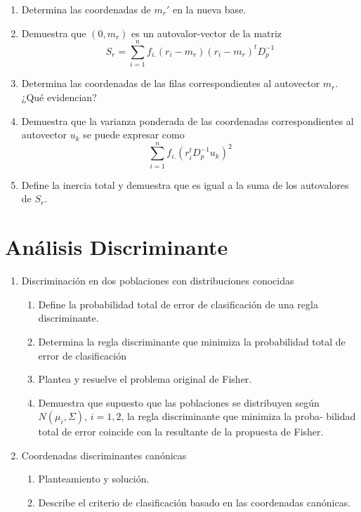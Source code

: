 \documentclass[twoside]{article}
\begin{document}
\begin{enumerate}
\item Determina las coordenadas de $m_r'$ en la nueva base. 
\item Demuestra que $(0, m_r)$ es un autovalor-vector de la matriz
\[ S_r = \sum_{i=1}^n f_{i.} (r_i - m_r) (r_i - m_r)^t D_p^{-1} \]
\item Determina las coordenadas de las filas correspondientes al autovector $m_r$. ¿Qué evidencian?
\item Demuestra que la varianza ponderada de las coordenadas correspondientes al autovector $u_k$ se puede expresar como
\[ \sum_{i=1}^n f_{i.} (r_i^t D_p^{-1} u_k)^2 \]
\item Define la inercia total y demuestra que es igual a la suma de los autovalores de $S_r$.
\end{enumerate}

\section{Análisis Discriminante}
\begin{enumerate}
\item Discriminación en dos poblaciones con distribuciones conocidas
\begin{enumerate}
	\item Define la probabilidad total de error de clasificación de una regla discriminante.
	\item Determina la regla discriminante que minimiza la probabilidad total de error de clasificación 
	\item Plantea y resuelve el problema original de Fisher. 
	\item Demuestra que supuesto que las poblaciones se distribuyen según $N(\mu_i, \Sigma)$, $i = 1, 2$, la regla discriminante que minimiza la proba- bilidad total de error coincide con la resultante de la propuesta de Fisher.
\end{enumerate}
\item Coordenadas discriminantes canónicas 
\begin{enumerate}
	\item Planteamiento y solución.
	\item Describe el criterio de clasificación basado en las coordenadas canónicas.
\end{enumerate}
\end{enumerate}
\end{document}
